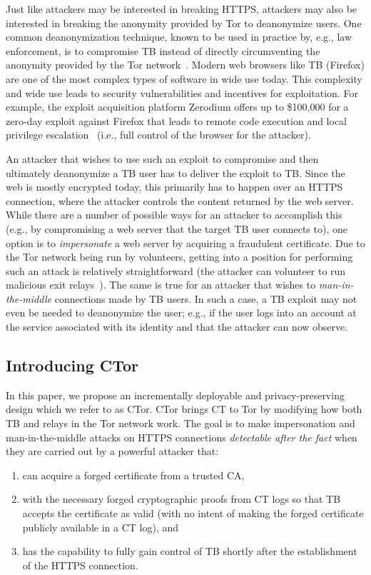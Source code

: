 Just like attackers may be interested in breaking HTTPS, attackers may also be
interested in breaking the anonymity provided by Tor to deanonymize users. One
common deanonymization technique, known to be used in practice by, e.g., law
enforcement, is to compromise TB instead of directly circumventing the anonymity
provided by the Tor network~\cite{selfrando,lepop1,lepop2,zerotor}. Modern web
browsers like TB (Firefox) are one of the most complex types of software in wide
use today. This complexity and wide use leads to security vulnerabilities and
incentives for exploitation. For example, the exploit acquisition platform
Zerodium offers up to \$100,000 for a zero-day exploit against Firefox that
leads to remote code execution and local privilege escalation~\cite{zeromain}
(i.e., full control of the browser for the attacker).

An attacker that wishes to use such an exploit to compromise and then ultimately
deanonymize a TB user has to deliver the exploit to TB\@. Since the web is
mostly encrypted today, this primarily has to happen over an HTTPS connection,
where the attacker controls the content returned by the web server. While there
are a number of possible ways for an attacker to accomplish this (e.g., by
compromising a web server that the target TB user connects to), one option is to
\emph{impersonate} a web server by acquiring a fraudulent certificate. Due to
the Tor network being run by volunteers, getting into a position for performing
such an attack is relatively straightforward (the attacker can volunteer to run
malicious exit relays~\cite{spoiled-onions}). The same is true for an attacker that
wishes to \emph{man-in-the-middle} connections made by TB users. In such a case,
a TB exploit may not even be needed to deanonymize the user; e.g., if the user
logs into an account at the service associated with its identity and that the
attacker can now observe.

\subsection{Introducing CTor}
In this paper, we propose an incrementally deployable and privacy-preserving
design which we refer to as CTor. CTor brings CT to Tor by modifying how both TB
and relays in the Tor network work. The goal is to make impersonation and
man-in-the-middle attacks on HTTPS connections \emph{detectable after the fact}
when they are carried out by a powerful attacker that:
\begin{enumerate}
	\item can acquire a forged certificate from a trusted CA,
	\item with the necessary forged cryptographic proofs from CT logs so that TB
	accepts the certificate as valid (with no intent of making the forged
	certificate publicly available in a CT log), and
	\item has the capability to fully gain control of TB shortly after the
	establishment of the HTTPS connection.
\end{enumerate}

